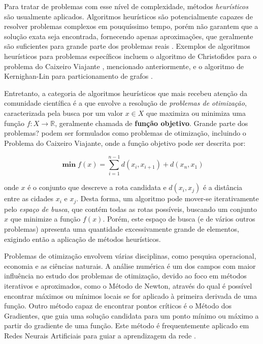 \documentclass[12pt]{article}
\begin{document}
Para tratar de problemas com esse nível de complexidade, métodos \textit{heurísticos} são usualmente aplicados. Algoritmos heurísticos são potencialmente capazes de resolver problemas complexos em pouquíssimo tempo, porém não garantem que a solução exata seja encontrada, fornecendo apenas aproximações, que geralmente são suficientes para grande parte dos problemas reais \cite{Kokash2005}. Exemplos de algoritmos heurísticos para problemas específicos incluem o algoritmo de Christofides para o problema do Caixeiro Viajante \cite{Christofides1976}, mencionado anteriormente, e o algoritmo de Kernighan-Lin para particionamento de grafos \cite{Kernighan1970}.

Entretanto, a categoria de algoritmos heurísticos que mais recebeu atenção da comunidade científica é a que envolve a resolução de \textit{problemas de otimização}, caracterizada pela busca por um valor $x \in X$ que maximiza ou minimiza uma função $f: X \rightarrow \mathbb{R}$, geralmente chamada de \textbf{função objetivo}. Grande parte dos problemas? podem ser formulados como problemas de otimização, incluindo o Problema do Caixeiro Viajante, onde a função objetivo pode ser descrita por:

\begin{equation} \label{eq:tsp}
    \mathop{\boldsymbol\min} f(x) = \sum_{i = 1}^{n - 1} d(x_{i}, x_{i + 1}) + d(x_{n}, x_{1})
\end{equation}

\noindent onde $x$ é o conjunto que descreve a rota candidata e $d(x_{i}, x_{j})$ é a distância entre as cidades $x_{i}$ e $x_{j}$. Desta forma, um algoritmo pode mover-se iterativamente pelo \textit{espaço de busca}, que contém todas as rotas possíveis, buscando um conjunto $x$ que minimize a função $f(x)$. Porém, este espaço de busca (e de vários outros problemas) apresenta uma quantidade excessivamente grande de elementos, exigindo então a aplicação de métodos heurísticos.

Problemas de otimização envolvem várias disciplinas, como pesquisa operacional, economia e as ciências naturais. A análise numérica é um dos campos com maior influência no estudo dos problemas de otimização, devido ao foco em métodos iterativos e aproximados, como o Método de Newton, através do qual é possível encontrar máximos ou mínimos locais se for aplicado à primeira derivada de uma função. Outro método capaz de encontrar pontos críticos é o Método dos Gradientes, que guia uma solução candidata para um ponto mínimo ou máximo a partir do gradiente de uma função. Este método é frequentemente aplicado em Redes Neurais Artificiais para guiar a aprendizagem da rede \cite{Haykin1998}.
\end{document}
